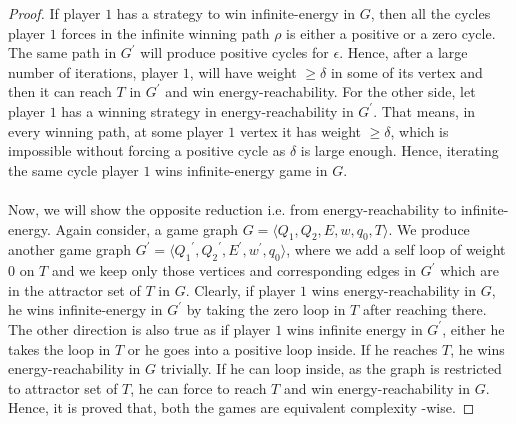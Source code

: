 \begin{proof}
If player $1$ has a strategy to win infinite-energy in $G$, then all the cycles player $1$ forces in the infinite winning path $\rho$ is either a positive or a zero cycle. The same path in $G^{\prime}$ will produce positive cycles for $\epsilon$. Hence, after a large number of iterations, player $1$, will have weight $\geq \delta$ in some of its vertex and then it can reach $T$ in $G^{\prime}$ and win energy-reachability. For the other side, let player $1$ has a winning strategy in energy-reachability in $G^{\prime}$. That means, in every winning path, at some player $1$ vertex it has weight $\geq \delta$, which is impossible without forcing a positive cycle as $\delta$ is large enough. Hence, iterating the same cycle player $1$ wins infinite-energy game in $G$.\\
\\
Now, we will show the opposite reduction i.e. from energy-reachability to infinite-energy. Again consider, a game graph $G=\langle Q_1, Q_2, E, w, q_0, T\rangle$. We produce another game graph $G^{\prime}=\langle {Q_1}^{\prime}, {Q_2}^{\prime}, E^{\prime}, w^{\prime}, q_0\rangle$, where we add a self loop of weight $0$ on $T$ and we keep only those vertices and corresponding edges in $G^{\prime}$ which are in the attractor set of $T$ in $G$. Clearly, if player $1$ wins energy-reachability in $G$, he wins infinite-energy in $G^{\prime}$ by taking the zero loop in $T$ after reaching there. The other direction is also true as if player $1$ wins infinite energy in $G^{\prime}$, either he takes the loop in $T$ or he goes into a positive loop inside. If he reaches $T$, he wins energy-reachability in $G$ trivially. If he can loop inside, as the graph is restricted to attractor set of $T$, he can force to reach $T$ and win energy-reachability in $G$. Hence, it is proved that, both the games are equivalent complexity -wise.
\end{proof}

